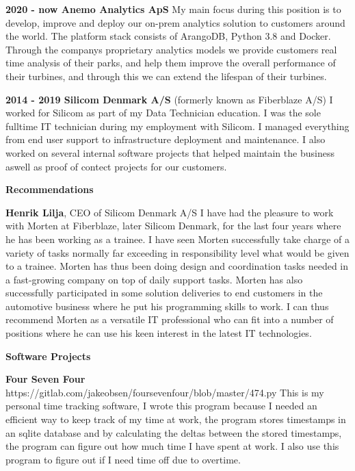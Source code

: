 \documentclass[11pt]{article}
\begin{document}
\textbf{2020 - now      Anemo Analytics ApS}\newline
My main focus during this position is to develop, improve and deploy our on-prem analytics solution to customers
around the world. The platform stack consists of ArangoDB, Python 3.8 and Docker. Through the companys
proprietary analytics models we provide customers real time analysis of their parks, and help them improve the
overall performance of their turbines, and through this we can extend the lifespan of their turbines.\newline

\textbf{2014 - 2019     Silicom Denmark A/S} (formerly known as Fiberblaze A/S)\newline
I worked for Silicom as part of my Data Technician education. I was the sole fulltime IT technician during my
employment with Silicom. I managed everything from end user support to infrastructure deployment and
maintenance. I also worked on several internal software projects that helped maintain the business aswell as
proof of contect projects for our customers.\newline

\textcolor{mygreen}{{\fontsize{13}{16}\textbf{{Recommendations}}}}\newline

\textbf{Henrik Lilja}, CEO of Silicom Denmark A/S\newline
I have had the pleasure to work with Morten at Fiberblaze, later Silicom Denmark, for the last four years where
he has been working as a trainee. I have seen Morten successfully take charge of a variety of tasks normally far
exceeding in responsibility level what would be given to a trainee.  Morten has thus been doing design and
coordination tasks needed in a fast-growing company on top of daily support tasks. Morten has also successfully
participated in some solution deliveries to end customers in the automotive business where he put his
programming skills to work. I can thus recommend Morten as a versatile IT professional who can fit into a number
of positions where he can use his keen interest in the latest IT technologies.\newline

\newpage

\textcolor{mygreen}{{\fontsize{13}{16}\textbf{{Software Projects}}}}\newline

\textbf{Four Seven Four}\newline
\textcolor{mygreen}{https://gitlab.com/jakeobsen/foursevenfour/blob/master/474.py}\newline
This is my personal time tracking software, I wrote this program because I needed an efficient way to keep track
of my time at work, the program stores timestamps in an sqlite database and by calculating the deltas between
the stored timestamps, the program can figure out how much time I have spent at work. I also use this program to
figure out if I need time off due to overtime.\newline
\end{document}
